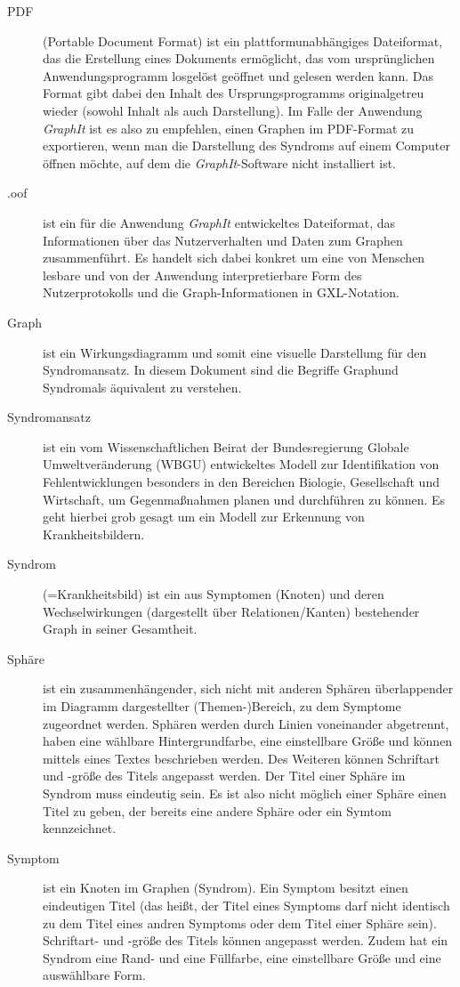 \documentclass[enabledeprecatedfontcommands,fontsize=11pt,paper=a4,twoside]{scrartcl}
\newcounter{one}
\begin{document}
\begin{description}
	\item[PDF] (Portable Document Format) ist ein plattformunabhängiges Dateiformat, das die Erstellung eines Dokuments ermöglicht, das vom ursprünglichen Anwendungsprogramm losgelöst geöffnet und gelesen werden kann. Das Format gibt dabei den Inhalt des Ursprungsprogramms originalgetreu wieder (sowohl Inhalt als auch Darstellung).  Im Falle der Anwendung \textit{GraphIt} ist es also zu empfehlen, einen Graphen im PDF-Format zu exportieren, wenn man die Darstellung des Syndroms auf einem Computer öffnen möchte, auf dem die \textit{GraphIt}-Software nicht installiert ist.
	\item[.oof] ist ein für die Anwendung \textit{GraphIt} entwickeltes Dateiformat, das Informationen über das Nutzerverhalten und Daten zum Graphen zusammenführt. Es handelt sich dabei konkret um eine von Menschen lesbare und von der Anwendung interpretierbare Form des Nutzerprotokolls und die Graph-Informationen in GXL-Notation.
	\item[Graph] ist ein Wirkungsdiagramm und somit eine visuelle Darstellung für den Syndromansatz.  In diesem Dokument sind die Begriffe \glqq Graph\grqq und \glqq Syndrom\grqq als äquivalent zu verstehen.
	\item[Syndromansatz] ist ein vom \glqq Wissenschaftlichen Beirat der Bundesregierung Globale Umweltveränderung \grqq{} (WBGU) entwickeltes Modell zur Identifikation von Fehlentwicklungen besonders in den Bereichen Biologie, Gesellschaft und Wirtschaft, um Gegenmaßnahmen planen und durchführen zu können. Es geht hierbei grob gesagt um ein Modell zur Erkennung von \glqq Krankheitsbildern\grqq. 
	\item[Syndrom] (=Krankheitsbild) ist ein aus Symptomen (Knoten) und deren Wechselwirkungen (dargestellt über Relationen/Kanten) bestehender Graph in seiner Gesamtheit. 
	\item[Sphäre] ist ein zusammenhängender, sich nicht mit anderen Sphären überlappender im Diagramm dargestellter (Themen-)Bereich, zu dem Symptome zugeordnet werden. Sphären werden durch Linien voneinander abgetrennt, haben eine wählbare Hintergrundfarbe, eine einstellbare Größe und können mittels eines Textes beschrieben werden. Des Weiteren können Schriftart und -größe des Titels angepasst werden. Der Titel einer Sphäre im Syndrom muss eindeutig sein. Es ist also nicht möglich einer Sphäre einen Titel zu geben, der bereits eine andere Sphäre oder ein Symtom kennzeichnet.
	\item[Symptom] ist ein Knoten im Graphen (Syndrom). Ein Symptom besitzt einen eindeutigen Titel (das heißt, der Titel eines Symptoms darf nicht identisch zu dem Titel eines andren Symptoms oder dem Titel einer Sphäre sein). Schriftart- und -größe des Titels können angepasst werden. Zudem hat ein Syndrom eine Rand- und eine Füllfarbe, eine einstellbare Größe und eine auswählbare Form.

\end{description}
\end{document}
